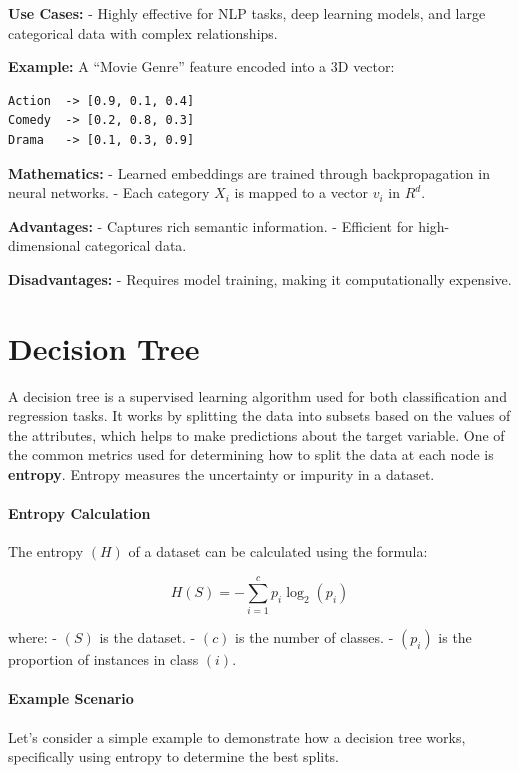 \documentclass[12pt]{book}
\begin{document}
\textbf{Use Cases:} - Highly effective for NLP tasks, deep learning
models, and large categorical data with complex relationships.

\textbf{Example:} A ``Movie Genre'' feature encoded into a 3D vector:

\begin{verbatim}
Action  -> [0.9, 0.1, 0.4]
Comedy  -> [0.2, 0.8, 0.3]
Drama   -> [0.1, 0.3, 0.9]
\end{verbatim}

\textbf{Mathematics:} - Learned embeddings are trained through
backpropagation in neural networks. - Each category \( X_{i} \) is mapped
to a vector \( v_{i} \) in \( R^{d} \).

\textbf{Advantages:} - Captures rich semantic information. - Efficient
for high-dimensional categorical data.

\textbf{Disadvantages:} - Requires model training, making it
computationally expensive.


\chapter{Decision Tree}

A decision tree is a supervised learning algorithm used for both
classification and regression tasks. It works by splitting the data into
subsets based on the values of the attributes, which helps to make
predictions about the target variable. One of the common metrics used
for determining how to split the data at each node is \textbf{entropy}.
Entropy measures the uncertainty or impurity in a dataset.

\subsubsection{Entropy Calculation}\label{entropy-calculation}

The entropy \(( H )\) of a dataset can be calculated using the formula:

\[
H(S) = -\sum_{i=1}^{c} p_i \log_2(p_i)
\]

where: - \(( S )\) is the dataset. - \(( c )\) is the number of classes.
- \(( p_{i} )\) is the proportion of instances in class \(( i )\).

\subsubsection{Example Scenario}\label{example-scenario}

Let's consider a simple example to demonstrate how a decision tree
works, specifically using entropy to determine the best splits.
\end{document}
